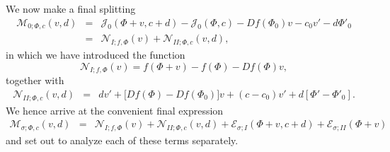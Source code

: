 \documentclass[10pt]{articleHJ}
\numberwithin{equation}{section}
\begin{document}
We now make a final splitting
\begin{equation}
\begin{array}{lcl}
\mathcal{M}_{0;\Phi,c}(v, d)
 & = & \mathcal{J}_0(\Phi + v, c + d )
- \mathcal{J}_0(\Phi , c  )
- Df(\Phi_0) v - c_{0} v'
 - d \Phi'_{0}
\\[0.2cm]
& = &
  \mathcal{N}_{I;f,\Phi} (v)
+ \mathcal{N}_{II;\Phi, c}(v,d),
\end{array}
\end{equation}
in which we have introduced the function
\begin{equation}
\mathcal{N}_{I;f,\Phi}(v) =
  f(\Phi + v) - f(\Phi) - Df(\Phi) v,
\end{equation}
together with
\begin{equation}
\begin{array}{lcl}
\mathcal{N}_{II; \Phi, c}(v, d)
& = &
   d v'
+ \big[Df(\Phi) -  Df(\Phi_0 )   \big] v
 + (c - c_{0}) v'
 + d [\Phi' - \Phi'_{0} ] .
\end{array}
\end{equation}
We hence arrive at the convenient final expression
\begin{equation}
\label{eq:swv:id:for:m:sigma}
\begin{array}{lcl}
\mathcal{M}_{\sigma;\Phi, c}(v , d)
& = &
  \mathcal{N}_{I;f,\Phi}(v)
  +  \mathcal{N}_{II;\Phi, c}(v,d)
   + \mathcal{E}_{\sigma;I}(\Phi + v, c+ d)
    + \mathcal{E}_{\sigma;II}(\Phi + v)
\end{array}
\end{equation}
and set out to analyze each of these
terms separately.
\end{document}
